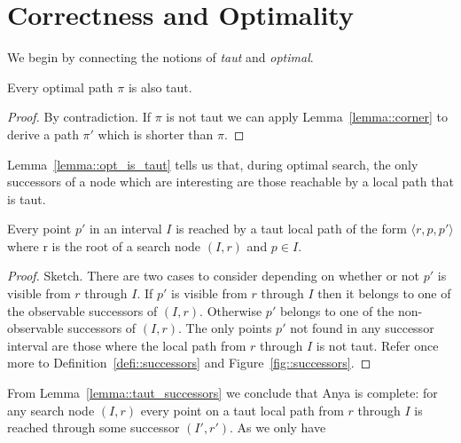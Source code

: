 \section{Correctness and Optimality}
We begin by connecting the notions of \emph{taut} and \emph{optimal}.
\begin{lemm}
\label{lemma::opt_is_taut}
Every optimal path $\pi$ is also taut.
\end{lemm}
\begin{proof}
By contradiction. If $\pi$ is not taut we can apply 
Lemma~\ref{lemma::corner} to derive a path $\pi'$ which is 
shorter than $\pi$. 
\end{proof}
Lemma~\ref{lemma::opt_is_taut} tells us that,
during optimal search, the only successors of a node which
are interesting are those reachable by a local path that is taut.
\begin{lemm}
\label{lemma::taut_successors}
Every point $p'$ in an interval $I$ is reached by a taut local
path of the form $\langle r, p, p' \rangle$ where
r is the root of a search node $(I, r)$ and $p \in I$.
\end{lemm}
\begin{proof}
Sketch. There are two cases to consider depending on whether or not $p'$ is
visible from $r$ through $I$.  If $p'$ is visible from $r$ through $I$ then it
belongs to one of the observable successors of $(I, r)$. Otherwise $p'$ belongs
to one of the non-observable successors of $(I, r)$.  The only points $p'$ not
found in any successor interval are those where the local path from $r$ through 
$I$ is not taut. Refer once more to Definition~\ref{defi::successors} and
Figure~\ref{fig::successors}.
\end{proof}
From Lemma~\ref{lemma::taut_successors} we conclude that Anya is complete: for
any search node $(I, r)$ every point on a taut local path from $r$ through
$I$ is reached through some successor $(I', r')$.  As we only have
